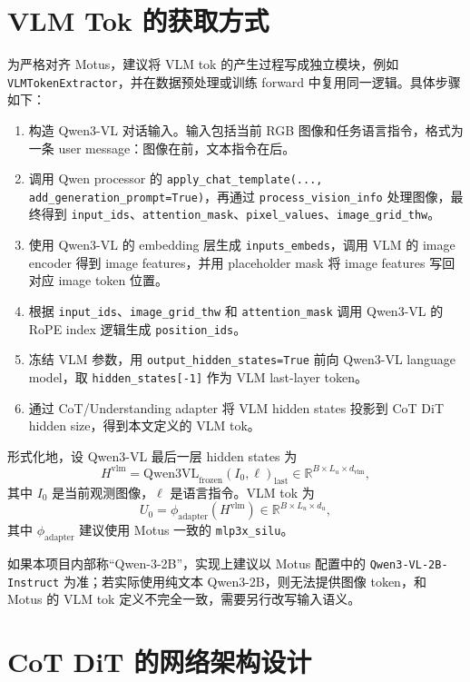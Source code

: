 \documentclass[UTF8,a4paper,11pt]{ctexart}
\begin{document}
\section{VLM Tok 的获取方式}

为严格对齐 Motus，建议将 VLM tok 的产生过程写成独立模块，例如 \texttt{VLMTokenExtractor}，并在数据预处理或训练 forward 中复用同一逻辑。具体步骤如下：

\begin{enumerate}[leftmargin=1.8em]
  \item 构造 Qwen3-VL 对话输入。输入包括当前 RGB 图像和任务语言指令，格式为一条 user message：图像在前，文本指令在后。
  \item 调用 Qwen processor 的 \texttt{apply\_chat\_template(..., add\_generation\_prompt=True)}，再通过 \texttt{process\_vision\_info} 处理图像，最终得到 \texttt{input\_ids}、\texttt{attention\_mask}、\texttt{pixel\_values}、\texttt{image\_grid\_thw}。
  \item 使用 Qwen3-VL 的 embedding 层生成 \texttt{inputs\_embeds}，调用 VLM 的 image encoder 得到 image features，并用 placeholder mask 将 image features 写回对应 image token 位置。
  \item 根据 \texttt{input\_ids}、\texttt{image\_grid\_thw} 和 \texttt{attention\_mask} 调用 Qwen3-VL 的 RoPE index 逻辑生成 \texttt{position\_ids}。
  \item 冻结 VLM 参数，用 \texttt{output\_hidden\_states=True} 前向 Qwen3-VL language model，取 \texttt{hidden\_states[-1]} 作为 VLM last-layer token。
  \item 通过 CoT/Understanding adapter 将 VLM hidden states 投影到 CoT DiT hidden size，得到本文定义的 VLM tok。
\end{enumerate}

形式化地，设 Qwen3-VL 最后一层 hidden states 为
\[
H^{\mathrm{vlm}} = \mathrm{Qwen3VL}_{\mathrm{frozen}}(I_0, \ell)_{\mathrm{last}}
\in \mathbb{R}^{B \times L_u \times d_{\mathrm{vlm}}},
\]
其中 $I_0$ 是当前观测图像，$\ell$ 是语言指令。VLM tok 为
\[
U_0 = \phi_{\mathrm{adapter}}(H^{\mathrm{vlm}})
\in \mathbb{R}^{B \times L_u \times d_u},
\]
其中 $\phi_{\mathrm{adapter}}$ 建议使用 Motus 一致的 \texttt{mlp3x\_silu}。

如果本项目内部称“Qwen-3-2B”，实现上建议以 Motus 配置中的 \texttt{Qwen3-VL-2B-Instruct} 为准；若实际使用纯文本 Qwen3-2B，则无法提供图像 token，和 Motus 的 VLM tok 定义不完全一致，需要另行改写输入语义。

\section{CoT DiT 的网络架构设计}
\end{document}
